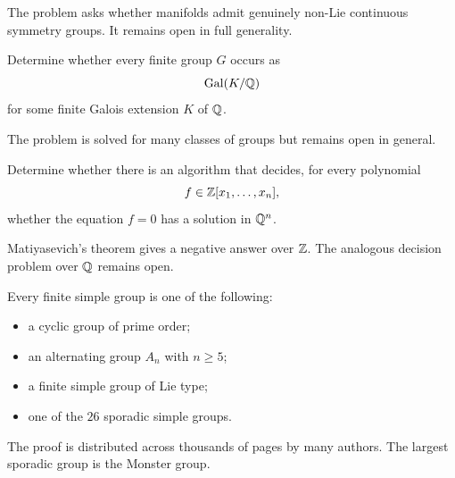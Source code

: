     \begin{remark}
        The problem asks whether manifolds admit genuinely non-Lie continuous
        symmetry groups. It remains open in full generality.
    \end{remark}

    \begin{openproblem}
        Determine whether every finite group $G$ occurs as
        \[
            \operatorname{Gal}(K/\mathbb{Q})
        \]
        for some finite Galois extension $K$ of $\mathbb{Q}$.
    \end{openproblem}

    \begin{remark}
        The problem is solved for many classes of groups but remains open in
        general.
    \end{remark}

    \begin{openproblem}
        Determine whether there is an algorithm that decides, for every
        polynomial
        \[
            f\in\mathbb{Z}[x_1,\dots,x_n],
        \]
        whether the equation $f=0$ has a solution in $\mathbb{Q}^n$.
    \end{openproblem}

    \begin{remark}
        Matiyasevich's theorem gives a negative answer over $\mathbb{Z}$. The analogous
        decision problem over $\mathbb{Q}$ remains open.
    \end{remark}

    \begin{theorem}
        Every finite simple group is one of the following:
        \begin{itemize}
            \item a cyclic group of prime order;
            \item an alternating group $A_n$ with $n\geq 5$;
            \item a finite simple group of Lie type;
            \item one of the $26$ sporadic simple groups.
        \end{itemize}
    \end{theorem}

    \begin{remark}
        The proof is distributed across thousands of pages by many authors.
        The largest sporadic group is the Monster group.
    \end{remark}

